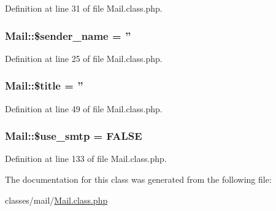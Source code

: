 Definition at line 31 of file Mail.\+class.\+php.

\hypertarget{classMail_a0ad6aa18dc8ea8c632bb7a82175e8d68}{
\subsubsection[{\$sender\+\_\+name}]{\setlength{\rightskip}{0pt plus 5cm}Mail\+::\$sender\+\_\+name = ''}}\label{classMail_a0ad6aa18dc8ea8c632bb7a82175e8d68}


Definition at line 25 of file Mail.\+class.\+php.

\hypertarget{classMail_aea1a8697c961d49a688564c5ca16cbcb}{
\subsubsection[{\$title}]{\setlength{\rightskip}{0pt plus 5cm}Mail\+::\$title = ''}}\label{classMail_aea1a8697c961d49a688564c5ca16cbcb}


Definition at line 49 of file Mail.\+class.\+php.

\hypertarget{classMail_a8fe39b2063dc112d7db67be074142628}{
\subsubsection[{\$use\+\_\+smtp}]{\setlength{\rightskip}{0pt plus 5cm}Mail\+::\$use\+\_\+smtp = F\+A\+L\+S\+E}}\label{classMail_a8fe39b2063dc112d7db67be074142628}


Definition at line 133 of file Mail.\+class.\+php.



The documentation for this class was generated from the following file\+:\begin{DoxyCompactItemize}
\item 
classes/mail/\hyperlink{Mail_8class_8php}{Mail.\+class.\+php}\end{DoxyCompactItemize}
